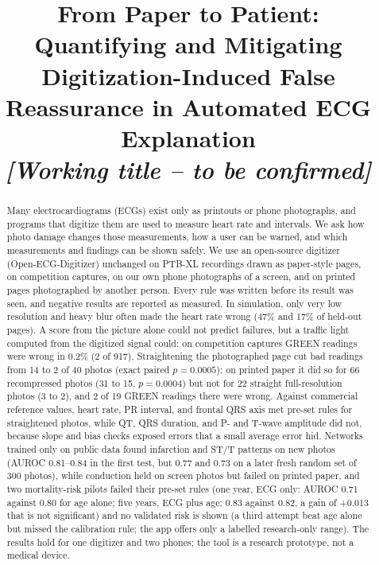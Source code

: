 \documentclass[conference]{IEEEtran}
\begin{document}
\title{From Paper to Patient: Quantifying and Mitigating Digitization-Induced False Reassurance in Automated ECG Explanation\\
\large \textit{[Working title -- to be confirmed]}}

\author{
}

\maketitle

\begin{abstract}
Many electrocardiograms (ECGs) exist only as printouts or phone photographs, and programs that digitize them are used to measure heart rate and intervals. We ask how photo damage changes those measurements, how a user can be warned, and which measurements and findings can be shown safely. We use an open-source digitizer (Open-ECG-Digitizer) unchanged on PTB-XL recordings drawn as paper-style pages, on competition captures, on our own phone photographs of a screen, and on printed pages photographed by another person. Every rule was written before its result was seen, and negative results are reported as measured. In simulation, only very low resolution and heavy blur often made the heart rate wrong (47\% and 17\% of held-out pages). A score from the picture alone could not predict failures, but a traffic light computed from the digitized signal could: on competition captures GREEN readings were wrong in 0.2\% (2 of 917). Straightening the photographed page cut bad readings from 14 to 2 of 40 photos (exact paired $p=0.0005$); on printed paper it did so for 66 recompressed photos (31 to 15, $p=0.0004$) but not for 22 straight full-resolution photos (3 to 2), and 2 of 19 GREEN readings there were wrong. Against commercial reference values, heart rate, PR interval, and frontal QRS axis met pre-set rules for straightened photos, while QT, QRS duration, and P- and T-wave amplitude did not, because slope and bias checks exposed errors that a small average error hid. Networks trained only on public data found infarction and ST/T patterns on new photos (AUROC 0.81--0.84 in the first test, but 0.77 and 0.73 on a later fresh random set of 300 photos), while conduction held on screen photos but failed on printed paper, and two mortality-risk pilots failed their pre-set rules (one year, ECG only: AUROC 0.71 against 0.80 for age alone; five years, ECG plus age: 0.83 against 0.82, a gain of +0.013 that is not significant) and no validated risk is shown (a third attempt beat age alone but missed the calibration rule; the app offers only a labelled research-only range). The results hold for one digitizer and two phones; the tool is a research prototype, not a medical device.
\end{abstract}
\end{document}
